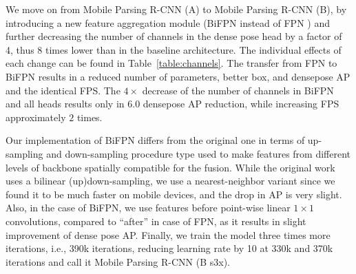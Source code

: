 We move on from Mobile Parsing R-CNN (A) to Mobile Parsing R-CNN (B), by introducing a  new feature aggregation module (BiFPN \cite{bifpn} instead of FPN \cite{fpn}) and further decreasing the number of channels in the dense pose head by a factor of 4, thus 8 times lower than in the baseline architecture. The individual effects of each change can be found in Table~\ref{table:channels}. The transfer from FPN to BiFPN results in a reduced number of parameters,  better box, and densepose AP and the identical FPS. The $4\times$ decrease of the number of channels in BiFPN and all heads results only in $6.0$ densepose AP reduction, while increasing FPS approximately $2$ times.


Our implementation of BiFPN differs from the original one in terms of up-sampling and down-sampling procedure type used to make features from different levels of backbone spatially compatible for the fusion. While the original work uses a bilinear (up)down-sampling, we use a nearest-neighbor variant since we found it to be much faster on mobile devices, and the drop in AP is very slight. Also, in the case of BiFPN, we use features before point-wise linear $1\times1$ convolutions, compared to ``after'' in case of FPN, as it results in slight improvement of dense pose AP. Finally, we train the model three times more iterations, i.e., 390k iterations, reducing learning rate by 10 at 330k and 370k iterations and call it Mobile Parsing R-CNN (B s3x).

\begin{table}[t!]
\centering
{}
\caption{Ablation on neck type and number of channels. The number of channels is the same in neck and heads. Results on DensePose-COCO \textit{minival}}
\label{table:channels}
\end{table}

